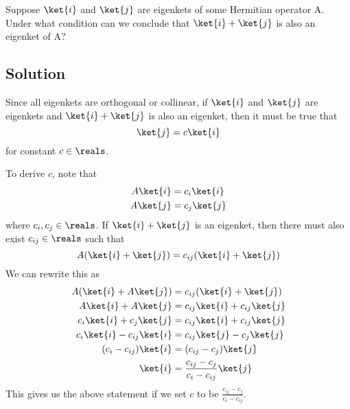 Suppose $\ket{i}$ and $\ket{j}$ are eigenkets of some Hermitian
operator A.  Under what condition can we conclude that $\ket{i} +
\ket{j}$ is also an eigenket of A?

\subsection*{Solution}
Since all eigenkets are orthogonal or collinear, if $\ket{i}$ and
$\ket{j}$ are eigenkets and $\ket{i} + \ket{j}$ is also an eigenket,
then it must be true that
\[ \ket{j} = c\ket{i} \]
for constant $c\in\reals$.

To derive $c$, note that
\begin{align*}
  A\ket{i} &= c_i\ket{i} \\
  A\ket{j} &= c_j\ket{j}
\end{align*}
where $c_i,c_j\in\reals$.  If $\ket{i} + \ket{j}$ is an eigenket, then
there must also exist $c_{ij}\in\reals$ such that
\[A(\ket{i} + \ket{j}) = c_{ij}(\ket{i} + \ket{j})\]
We can rewrite this as
\begin{align*}
  A(\ket{i} + A\ket{j}) &= c_{ij}(\ket{i} + \ket{j}) \\
  A\ket{i} + A\ket{j} &= c_{ij}\ket{i} + c_{ij}\ket{j} \\
  c_i\ket{i} + c_j\ket{j} &= c_{ij}\ket{i} + c_{ij}\ket{j} \\
  c_i\ket{i} - c_{ij}\ket{i} &= c_{ij}\ket{j} - c_j\ket{j} \\
  (c_i - c_{ij})\ket{i} &= (c_{ij} - c_{j})\ket{j} \\
  \ket{i} &= \frac{c_{ij} - c_{j}}{c_i - c_{ij}}\ket{j}
\end{align*}
This gives us the above statement if we set $c$ to be $\frac{c_{ij} -
  c_{j}}{c_i - c_{ij}}$.
